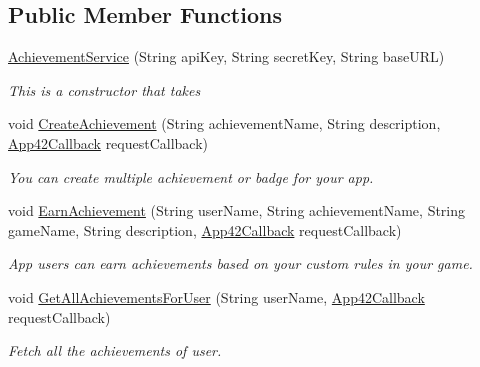 \subsection*{Public Member Functions}
\begin{DoxyCompactItemize}
\item 
\hyperlink{classcom_1_1shephertz_1_1app42_1_1paas_1_1sdk_1_1windows_1_1achievement_1_1_achievement_service_a149b988c60b693fdea7149fd295cbf19}{Achievement\+Service} (String api\+Key, String secret\+Key, String base\+U\+R\+L)
\begin{DoxyCompactList}\small\item\em This is a constructor that takes \end{DoxyCompactList}\item 
void \hyperlink{classcom_1_1shephertz_1_1app42_1_1paas_1_1sdk_1_1windows_1_1achievement_1_1_achievement_service_a3c148ce5b83f4807b921e0c092d0e169}{Create\+Achievement} (String achievement\+Name, String description, \hyperlink{interfacecom_1_1shephertz_1_1app42_1_1paas_1_1sdk_1_1windows_1_1_app42_callback}{App42\+Callback} request\+Callback)
\begin{DoxyCompactList}\small\item\em You can create multiple achievement or badge for your app. \end{DoxyCompactList}\item 
void \hyperlink{classcom_1_1shephertz_1_1app42_1_1paas_1_1sdk_1_1windows_1_1achievement_1_1_achievement_service_a554cdbd17d730a8ea654962ead24dc14}{Earn\+Achievement} (String user\+Name, String achievement\+Name, String game\+Name, String description, \hyperlink{interfacecom_1_1shephertz_1_1app42_1_1paas_1_1sdk_1_1windows_1_1_app42_callback}{App42\+Callback} request\+Callback)
\begin{DoxyCompactList}\small\item\em App users can earn achievements based on your custom rules in your game. \end{DoxyCompactList}\item 
void \hyperlink{classcom_1_1shephertz_1_1app42_1_1paas_1_1sdk_1_1windows_1_1achievement_1_1_achievement_service_a10bbb774de960970de105dd0f02f1d0f}{Get\+All\+Achievements\+For\+User} (String user\+Name, \hyperlink{interfacecom_1_1shephertz_1_1app42_1_1paas_1_1sdk_1_1windows_1_1_app42_callback}{App42\+Callback} request\+Callback)
\begin{DoxyCompactList}\small\item\em Fetch all the achievements of user. \end{DoxyCompactList}\item 

\end{DoxyCompactItemize}
